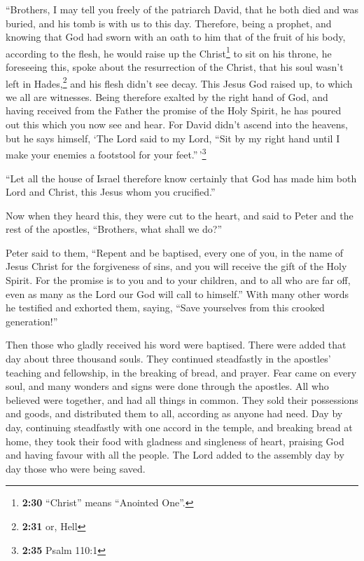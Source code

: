  ``Brothers, I may tell you freely of the patriarch
David, that he both died and was buried, and his tomb is with us to this
day.  Therefore, being a prophet, and knowing that God
had sworn with an oath to him that of the fruit of his body, according
to the flesh, he would raise up the Christ\footnote{\textbf{2:30}
  ``Christ'' means ``Anointed One''.} to sit on his throne,
 he foreseeing this, spoke about the resurrection of the
Christ, that his soul wasn't left in Hades,\footnote{\textbf{2:31} or,
  Hell} and his flesh didn't see decay.  This Jesus God
raised up, to which we all are witnesses.  Being
therefore exalted by the right hand of God, and having received from the
Father the promise of the Holy Spirit, he has poured out this which you
now see and hear.  For David didn't ascend into the
heavens, but he says himself, `The Lord said to my Lord, ``Sit by my
right hand  until I make your enemies a footstool for
your feet.''\,'\footnote{\textbf{2:35} Psalm 110:1}

 ``Let all the house of Israel therefore know certainly
that God has made him both Lord and Christ, this Jesus whom you
crucified.''

 Now when they heard this, they were cut to the heart,
and said to Peter and the rest of the apostles, ``Brothers, what shall
we do?''

 Peter said to them, ``Repent and be baptised, every one
of you, in the name of Jesus Christ for the forgiveness of sins, and you
will receive the gift of the Holy Spirit.  For the
promise is to you and to your children, and to all who are far off, even
as many as the Lord our God will call to himself.''  With
many other words he testified and exhorted them, saying, ``Save
yourselves from this crooked generation!''

 Then those who gladly received his word were baptised.
There were added that day about three thousand souls. 
They continued steadfastly in the apostles' teaching and fellowship, in
the breaking of bread, and prayer.  Fear came on every
soul, and many wonders and signs were done through the apostles.
 All who believed were together, and had all things in
common.  They sold their possessions and goods, and
distributed them to all, according as anyone had need. 
Day by day, continuing steadfastly with one accord in the temple, and
breaking bread at home, they took their food with gladness and
singleness of heart,  praising God and having favour with
all the people. The Lord added to the assembly day by day those who were
being saved.

